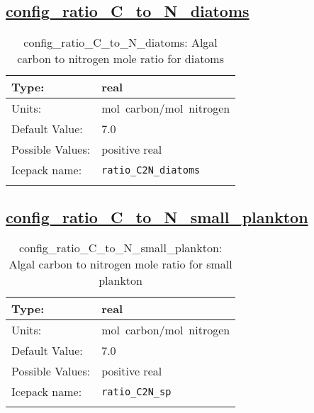 \subsection[config\_ratio\_C\_to\_N\_diatoms]{\hyperref[sec:nm_tab_biogeochemistry]{config\_ratio\_C\_to\_N\_diatoms}}
\label{subsec:nm_sec_config_ratio_C_to_N_diatoms}
\begin{center}
\begin{longtable}{| p{2.0in} || p{4.0in} |}
    \hline
    Type: & real \\
    \hline
    Units: & \si{mol.carbon/mol.nitrogen} \\
    \hline
    Default Value: & 7.0 \\
    \hline
    Possible Values: & positive real \\
    \hline
    \hline
    Icepack name: & \verb+ratio_C2N_diatoms+ \\
    \caption{config\_ratio\_C\_to\_N\_diatoms: Algal carbon to nitrogen mole ratio for diatoms}
\end{longtable}
\end{center}
\subsection[config\_ratio\_C\_to\_N\_small\_plankton]{\hyperref[sec:nm_tab_biogeochemistry]{config\_ratio\_C\_to\_N\_small\_plankton}}
\label{subsec:nm_sec_config_ratio_C_to_N_small_plankton}
\begin{center}
\begin{longtable}{| p{2.0in} || p{4.0in} |}
    \hline
    Type: & real \\
    \hline
    Units: & \si{mol.carbon/mol.nitrogen} \\
    \hline
    Default Value: & 7.0 \\
    \hline
    Possible Values: & positive real \\
    \hline
    \hline
    Icepack name: & \verb+ratio_C2N_sp+ \\
    \caption{config\_ratio\_C\_to\_N\_small\_plankton: Algal carbon to nitrogen mole ratio for small plankton}
\end{longtable}
\end{center}
